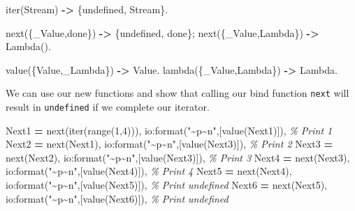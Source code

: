 \documentclass[
]{book}
\newenvironment{Shaded}{\begin{snugshade}}{\end{snugshade}}
\newcommand{\CharTok}[1]{\textcolor[rgb]{0.31,0.60,0.02}{#1}}
\newcommand{\CommentTok}[1]{\textcolor[rgb]{0.56,0.35,0.01}{\textit{#1}}}
\newcommand{\DecValTok}[1]{\textcolor[rgb]{0.00,0.00,0.81}{#1}}
\newcommand{\FunctionTok}[1]{\textcolor[rgb]{0.00,0.00,0.00}{#1}}
\newcommand{\OperatorTok}[1]{\textcolor[rgb]{0.81,0.36,0.00}{\textbf{#1}}}
\newcommand{\StringTok}[1]{\textcolor[rgb]{0.31,0.60,0.02}{#1}}
\newcommand{\VariableTok}[1]{\textcolor[rgb]{0.00,0.00,0.00}{#1}}
\begin{document}
\begin{Shaded}
\begin{Highlighting}[]
\FunctionTok{iter(}\VariableTok{Stream}\FunctionTok{)} \OperatorTok{{-}\textgreater{}} \FunctionTok{\{}\CharTok{undefined}\FunctionTok{,} \VariableTok{Stream}\FunctionTok{\}.}

\FunctionTok{next(\{}\VariableTok{\_Value}\FunctionTok{,}\CharTok{done}\FunctionTok{\})} \OperatorTok{{-}\textgreater{}} \FunctionTok{\{}\CharTok{undefined}\FunctionTok{,} \CharTok{done}\FunctionTok{\};}
\FunctionTok{next(\{}\VariableTok{\_Value}\FunctionTok{,}\VariableTok{Lambda}\FunctionTok{\})} \OperatorTok{{-}\textgreater{}} \VariableTok{Lambda}\FunctionTok{().}

\FunctionTok{value(\{}\VariableTok{Value}\FunctionTok{,}\VariableTok{\_Lambda}\FunctionTok{\})} \OperatorTok{{-}\textgreater{}} \VariableTok{Value}\FunctionTok{.}
\FunctionTok{lambda(\{}\VariableTok{\_Value}\FunctionTok{,}\VariableTok{Lambda}\FunctionTok{\})} \OperatorTok{{-}\textgreater{}} \VariableTok{Lambda}\FunctionTok{.}
\end{Highlighting}
\end{Shaded}

We can use our new functions and show that calling our bind function \texttt{next} will result in \texttt{undefined} if we complete our iterator.

\begin{Shaded}
\begin{Highlighting}[]
\VariableTok{Next1} \OperatorTok{=} \FunctionTok{next(iter(range(}\DecValTok{1}\FunctionTok{,}\DecValTok{4}\FunctionTok{))),}
\FunctionTok{io:format(}\StringTok{"\textasciitilde{}p\textasciitilde{}n"}\FunctionTok{,[value(}\VariableTok{Next1}\FunctionTok{)]),}  \CommentTok{\% Print 1}
\VariableTok{Next2} \OperatorTok{=} \FunctionTok{next(}\VariableTok{Next1}\FunctionTok{),}
\FunctionTok{io:format(}\StringTok{"\textasciitilde{}p\textasciitilde{}n"}\FunctionTok{,[value(}\VariableTok{Next3}\FunctionTok{)]),}  \CommentTok{\% Print 2}
\VariableTok{Next3} \OperatorTok{=} \FunctionTok{next(}\VariableTok{Next2}\FunctionTok{),}
\FunctionTok{io:format(}\StringTok{"\textasciitilde{}p\textasciitilde{}n"}\FunctionTok{,[value(}\VariableTok{Next3}\FunctionTok{)]),}  \CommentTok{\% Print 3}
\VariableTok{Next4} \OperatorTok{=} \FunctionTok{next(}\VariableTok{Next3}\FunctionTok{),}
\FunctionTok{io:format(}\StringTok{"\textasciitilde{}p\textasciitilde{}n"}\FunctionTok{,[value(}\VariableTok{Next4}\FunctionTok{)]),}  \CommentTok{\% Print 4}
\VariableTok{Next5} \OperatorTok{=} \FunctionTok{next(}\VariableTok{Next4}\FunctionTok{),}
\FunctionTok{io:format(}\StringTok{"\textasciitilde{}p\textasciitilde{}n"}\FunctionTok{,[value(}\VariableTok{Next5}\FunctionTok{)]),}  \CommentTok{\% Print undefined}
\VariableTok{Next6} \OperatorTok{=} \FunctionTok{next(}\VariableTok{Next5}\FunctionTok{),}
\FunctionTok{io:format(}\StringTok{"\textasciitilde{}p\textasciitilde{}n"}\FunctionTok{,[value(}\VariableTok{Next6}\FunctionTok{)]),}  \CommentTok{\% Print undefined}
\end{Highlighting}
\end{Shaded}
\end{document}
